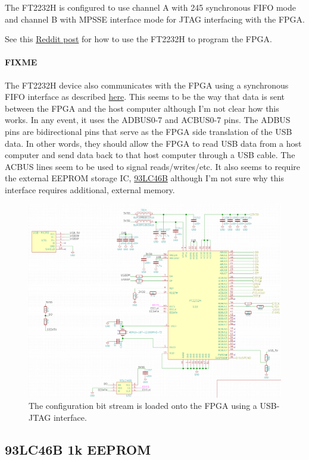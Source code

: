 The FT2232H is configured to use channel A with 245 synchronous FIFO mode and channel B with MPSSE
interface mode for JTAG interfacing with the FPGA\@.



See this
\href{https://www.reddit.com/r/FPGA/comments/4brday/confusion_regarding_jtag_and_ftdi_chips/}{Reddit
post} for how to use the FT2232H to program the FPGA\@.

\paragraph{FIXME} The FT2232H device also communicates with the FPGA using a synchronous FIFO
interface as described
\href{http://www.ftdichip.com/Support/Documents/AppNotes/AN_130_FT2232H_Used_In_FT245\%20Synchronous\%20FIFO\%20Mode.pdf}{here}. This
seems to be the way that data is sent between the FPGA and the host computer although I'm not clear
how this works. In any event, it uses the ADBUS0-7 and ACBUS0-7 pins. The ADBUS pins are
bidirectional pins that serve as the FPGA side translation of the USB data. In other words, they
should allow the FPGA to read USB data from a host computer and send data back to that host computer
through a USB cable. The ACBUS lines seem to be used to signal reads/writes/etc. It also seems to
require the external EEPROM storage IC,
\href{http://ww1.microchip.com/downloads/en/DeviceDoc/20001749K.pdf}{93LC46B} although I'm not sure
why this interface requires additional, external memory.

\begin{figure}[h]
        \centering
        \includegraphics[width=\textwidth]{data/usb-ft2232.png}
        \caption{The configuration bit stream is loaded onto the FPGA using a USB-JTAG interface.}
        \label{fig:usb-ft2232}
\end{figure}

\subsection{93LC46B 1k EEPROM}
\label{sec:93lc46b}

